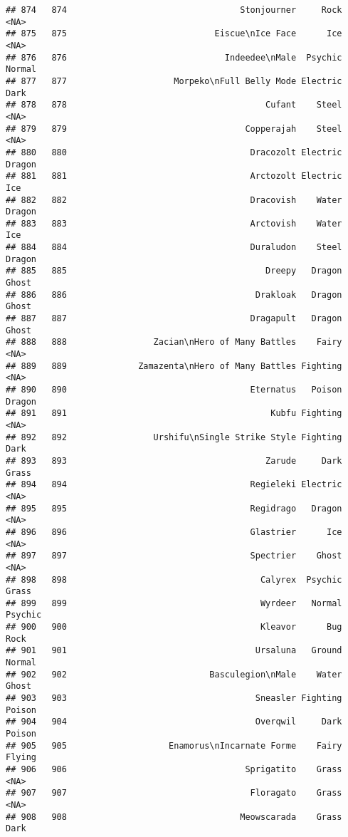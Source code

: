 \documentclass[
]{article}
\begin{document}
\begin{verbatim}
## 874   874                                  Stonjourner     Rock     <NA>
## 875   875                             Eiscue\nIce Face      Ice     <NA>
## 876   876                               Indeedee\nMale  Psychic   Normal
## 877   877                     Morpeko\nFull Belly Mode Electric     Dark
## 878   878                                       Cufant    Steel     <NA>
## 879   879                                   Copperajah    Steel     <NA>
## 880   880                                    Dracozolt Electric   Dragon
## 881   881                                    Arctozolt Electric      Ice
## 882   882                                    Dracovish    Water   Dragon
## 883   883                                    Arctovish    Water      Ice
## 884   884                                    Duraludon    Steel   Dragon
## 885   885                                       Dreepy   Dragon    Ghost
## 886   886                                     Drakloak   Dragon    Ghost
## 887   887                                    Dragapult   Dragon    Ghost
## 888   888                 Zacian\nHero of Many Battles    Fairy     <NA>
## 889   889              Zamazenta\nHero of Many Battles Fighting     <NA>
## 890   890                                    Eternatus   Poison   Dragon
## 891   891                                        Kubfu Fighting     <NA>
## 892   892                 Urshifu\nSingle Strike Style Fighting     Dark
## 893   893                                       Zarude     Dark    Grass
## 894   894                                    Regieleki Electric     <NA>
## 895   895                                    Regidrago   Dragon     <NA>
## 896   896                                    Glastrier      Ice     <NA>
## 897   897                                    Spectrier    Ghost     <NA>
## 898   898                                      Calyrex  Psychic    Grass
## 899   899                                      Wyrdeer   Normal  Psychic
## 900   900                                      Kleavor      Bug     Rock
## 901   901                                     Ursaluna   Ground   Normal
## 902   902                            Basculegion\nMale    Water    Ghost
## 903   903                                     Sneasler Fighting   Poison
## 904   904                                     Overqwil     Dark   Poison
## 905   905                    Enamorus\nIncarnate Forme    Fairy   Flying
## 906   906                                   Sprigatito    Grass     <NA>
## 907   907                                    Floragato    Grass     <NA>
## 908   908                                  Meowscarada    Grass     Dark

\end{verbatim}
\end{document}
